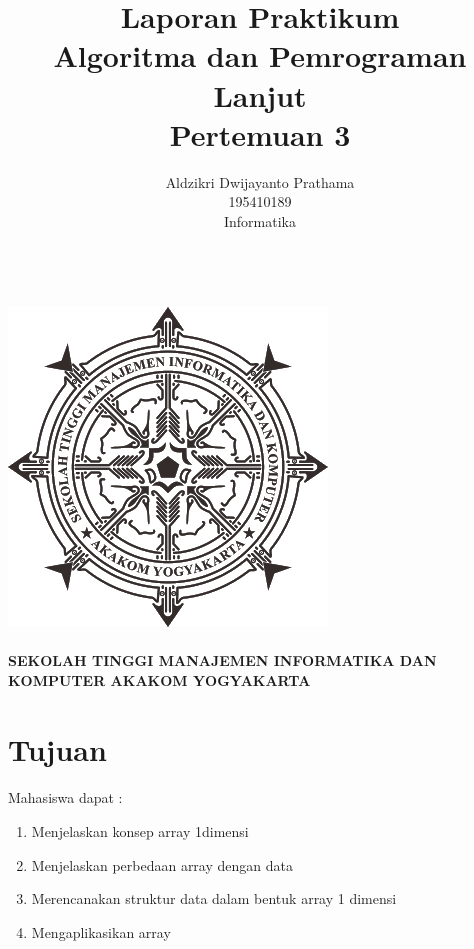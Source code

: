 \documentclass[a4paper,12pt]{article}
\begin{document}
\title{ {\Large Laporan Praktikum}\\ Algoritma dan Pemrograman Lanjut\\{\Large Pertemuan 3}}

\author{Aldzikri Dwijayanto Prathama 
	\\195410189
	\\Informatika}
\makeatletter
\begin{titlepage}
	\begin{center}
		{\huge \bfseries \@title }\\[14ex]
		\includegraphics[scale=.8]{logo}\\[4ex]
		{\large \@author}\\[12ex]
		{\large \bfseries {SEKOLAH TINGGI MANAJEMEN INFORMATIKA DAN KOMPUTER
				AKAKOM YOGYAKARTA}}
	\end{center}


\end{titlepage}
\makeatother
\newpage
\tableofcontents
\newpage

\section{Tujuan}
\paragraph{}
Mahasiswa dapat :
\begin{enumerate}
    \item Menjelaskan konsep array 1dimensi
    \item Menjelaskan perbedaan array dengan data
    \item Merencanakan struktur data dalam bentuk array 1 dimensi
    \item Mengaplikasikan array
\end{enumerate}
\end{document}
